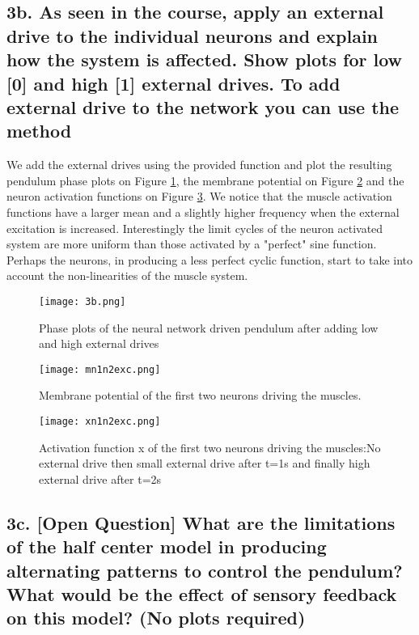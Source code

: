 \documentclass[11pt]{article}
\begin{document}
\subsection*{3b. As seen in the course, apply an external drive to the
  individual neurons and explain how the system is affected. Show
  plots for low [0] and high [1] external drives. To add external
  drive to the network you can use the method \\
   }
\label{sec:4c}

We add the external drives using the provided function and plot the resulting pendulum phase plots on Figure \ref{fig:newphase}, the membrane potential on Figure \ref{fig:membexc} and the neuron activation functions on Figure \ref{fig:actexc}.
We notice that the muscle activation functions have a larger mean and a slightly higher frequency when the external excitation is increased. Interestingly the limit cycles of the neuron activated system are more uniform than those activated by a "perfect" sine function. Perhaps the neurons, in producing a less perfect cyclic function, start to take into account the non-linearities of the muscle system. 



\begin{figure}[!h]
\centering
\texttt{[image: 3b.png]}

\caption{Phase plots of the neural network driven pendulum after adding low and high external drives }
\label{fig:newphase}
\end{figure}


\begin{figure}[!h]
\centering
\texttt{[image: mn1n2exc.png]}

\caption{Membrane potential of the first two neurons driving the muscles.}
\label{fig:membexc}
\end{figure}

\begin{figure}[!h]
\centering
\texttt{[image: xn1n2exc.png]}

\caption{Activation function x of the first two neurons driving the muscles:No external drive then small external drive after t=1s and finally high external drive after t=2s}
\label{fig:actexc}
\end{figure}
\newpage 

\subsection*{3c. [Open Question] What are the limitations of the half
  center model in producing alternating patterns to control the
  pendulum? What would be the effect of sensory feedback on this
  model? (No plots required)}
\label{sec:4d}
\end{document}

